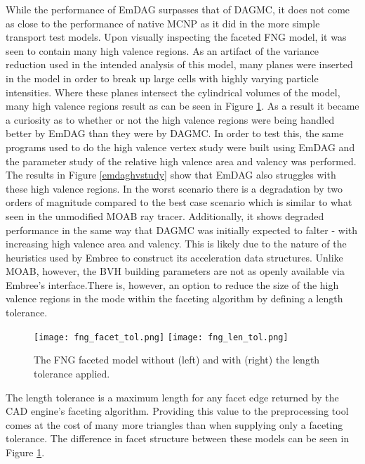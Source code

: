 While the performance of EmDAG surpasses that of DAGMC, it does not come
as close to the performance of native MCNP as it did in the more simple
transport test models. Upon visually inspecting the faceted FNG model, it was
seen to contain many high valence regions. As an artifact of the variance
reduction used in the intended analysis of this model, many planes were inserted
in the model in order to break up large cells with highly varying particle
intensities. Where these planes intersect the cylindrical volumes of the model,
many high valence regions result as can be seen in Figure
\ref{fng-faceted-models}. As a result it became a curiosity as to whether or
not the high valence regions were being handled better by EmDAG than they were
by DAGMC. In order to test this, the same programs used to do the high valence
vertex study were built using EmDAG and the parameter study of the relative high
valence area and valency was performed. The results in Figure \ref{emdaghvstudy}
show that EmDAG also struggles with these high valence regions. In the worst
scenario there is a degradation by two orders of magnitude compared to the best
case scenario which is similar to what seen in the unmodified MOAB ray
tracer. Additionally, it shows degraded performance in the same way that DAGMC
was initially expected to falter - with increasing high valence area and
valency. This is likely due to the nature of the heuristics used by Embree to
construct its acceleration data structures.  Unlike MOAB, however, the BVH
building parameters are not as openly available via Embree's interface.There is,
however, an option to reduce the size of the high valence regions in the mode
within the faceting algorithm by defining a length tolerance.

\begin{figure}[H]
  \small
  \begin{center}
    \texttt{[image: fng\_facet\_tol.png]}
    \texttt{[image: fng\_len\_tol.png]}
    \caption{The FNG faceted model without (left) and with (right) the length
      tolerance applied.}
    \label{fng-faceted-models}
  \end{center}
\end{figure}

The length tolerance is a maximum length for any facet edge returned by the CAD
engine's faceting algorithm. Providing this value to the preprocessing tool
comes at the cost of many more triangles than when supplying only a faceting
tolerance. The difference in facet structure between these models can be seen in
Figure \ref{fng-faceted-models}.

